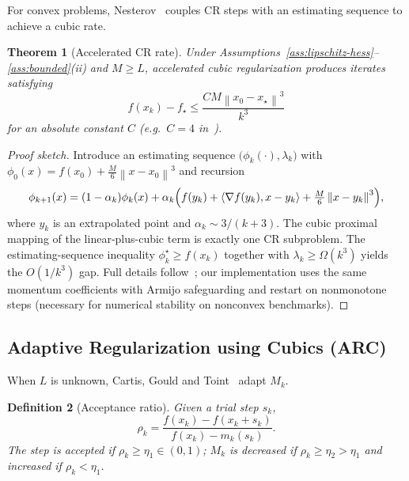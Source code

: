 \documentclass[11pt,a4paper]{article}
\newtheorem{theorem}{Theorem}[section]
\newtheorem{definition}[theorem]{Definition}
\newcommand{\norm}[1]{\left\|#1\right\|}
\newcommand{\inner}[2]{\left\langle #1,#2\right\rangle}
\newcommand{\grad}{\nabla}
\begin{document}
For convex problems, Nesterov~\cite{nesterov2008accelerate} couples CR steps with an estimating sequence to achieve a cubic rate.

\begin{theorem}[Accelerated CR rate]
\label{thm:acc-cr}
Under Assumptions~\ref{ass:lipschitz-hess}--\ref{ass:bounded}(ii) and $M\ge L$, accelerated cubic regularization produces iterates satisfying
\begin{equation}
f(x_{k})-f_{\star}
\le
\frac{CM\norm{x_{0}-x_{\star}}^{3}}{k^{3}}
\end{equation}
for an absolute constant $C$ (e.g.\ $C=4$ in~\cite{nesterov2008accelerate}).
\end{theorem}

\begin{proof}[Proof sketch]
Introduce an estimating sequence $\bigl(\phi_{k}(\cdot),\lambda_{k}\bigr)$ with $\phi_{0}(x)=f(x_{0})+\frac{M}{6}\norm{x-x_{0}}^{3}$ and recursion
\[
\phi_{k+1}(x)
=
(1-\alpha_{k})\phi_{k}(x)
+
\alpha_{k}\Bigl(f(y_{k})+\inner{\grad f(y_{k})}{x-y_{k}}+\tfrac{M}{6}\norm{x-y_{k}}^{3}\Bigr),
\]
where $y_{k}$ is an extrapolated point and $\alpha_{k}\sim 3/(k+3)$.
The cubic proximal mapping of the linear-plus-cubic term is exactly one CR subproblem.
The estimating-sequence inequality $\phi_{k}^{\star}\ge f(x_{k})$ together with $\lambda_{k}\ge\Omega(k^{3})$ yields the $O(1/k^{3})$ gap.
Full details follow~\cite{nesterov2008accelerate}; our implementation uses the same momentum coefficients with Armijo safeguarding and restart on nonmonotone steps (necessary for numerical stability on nonconvex benchmarks).
\end{proof}

\subsection{Adaptive Regularization using Cubics (ARC)}

When $L$ is unknown, Cartis, Gould and Toint~\cite{cartis2011arc} adapt $M_{k}$.

\begin{definition}[Acceptance ratio]
\label{def:rho}
Given a trial step $s_{k}$,
\begin{equation}
\rho_{k}
=
\frac{f(x_{k})-f(x_{k}+s_{k})}{f(x_{k})-m_{k}(s_{k})}.
\end{equation}
The step is accepted if $\rho_{k}\ge\eta_{1}\in(0,1)$; $M_{k}$ is decreased if $\rho_{k}\ge\eta_{2}>\eta_{1}$ and increased if $\rho_{k}<\eta_{1}$.
\end{definition}
\end{document}
